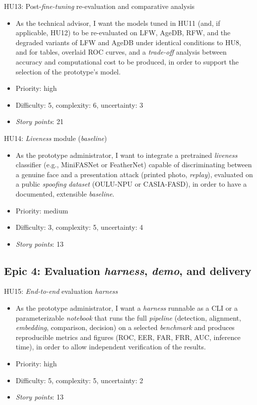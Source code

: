 \documentclass[
  11pt, %
]{charter}
\begin{document}
HU13: Post-\textit{fine-tuning} re-evaluation and comparative analysis
\begin{itemize}
  \item As the technical advisor, I want the models tuned in HU11 (and, if applicable, HU12) to be re-evaluated on LFW, AgeDB, RFW, and the degraded variants of LFW and AgeDB under identical conditions to HU8, and for tables, overlaid ROC curves, and a \textit{trade-off} analysis between accuracy and computational cost to be produced, in order to support the selection of the prototype's model.
  \item Priority: high
  \item Difficulty: 5, complexity: 6, uncertainty: 3
  \item \textit{Story points}: 21
\end{itemize}

HU14: \textit{Liveness} module (\textit{baseline})
\begin{itemize}
  \item As the prototype administrator, I want to integrate a pretrained \textit{liveness} classifier (e.g., MiniFASNet or FeatherNet) capable of discriminating between a genuine face and a presentation attack (printed photo, \textit{replay}), evaluated on a public \textit{spoofing} \textit{dataset} (OULU-NPU or CASIA-FASD), in order to have a documented, extensible \textit{baseline}.
  \item Priority: medium
  \item Difficulty: 3, complexity: 5, uncertainty: 4
  \item \textit{Story points}: 13
\end{itemize}

\subsection{Epic 4: Evaluation \textit{harness}, \textit{demo}, and delivery}

HU15: \textit{End-to-end} evaluation \textit{harness}
\begin{itemize}
  \item As the prototype administrator, I want a \textit{harness} runnable as a CLI or a parameterizable \textit{notebook} that runs the full \textit{pipeline} (detection, alignment, \textit{embedding}, comparison, decision) on a selected \textit{benchmark} and produces reproducible metrics and figures (ROC, EER, FAR, FRR, AUC, inference time), in order to allow independent verification of the results.
  \item Priority: high
  \item Difficulty: 5, complexity: 5, uncertainty: 2
  \item \textit{Story points}: 13
\end{itemize}
\end{document}
